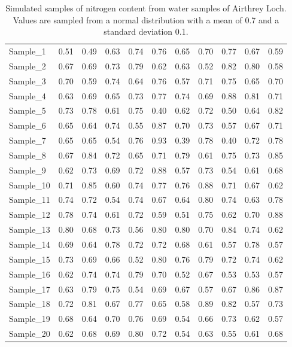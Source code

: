 \documentclass[
]{scrbook}
\begin{document}
\begin{longtable}[]{@{}lrrrrrrrrrr@{}}
\caption{\label{tab:unnamed-chunk-44}Simulated samples of nitrogen content from water samples of Airthrey Loch. Values are sampled from a normal distribution with a mean of 0.7 and a standard deviation 0.1.}\tabularnewline
\toprule
\endhead
Sample\_1 & 0.51 & 0.49 & 0.63 & 0.74 & 0.76 & 0.65 & 0.70 & 0.77 & 0.67 & 0.59 \\
Sample\_2 & 0.67 & 0.69 & 0.73 & 0.79 & 0.62 & 0.63 & 0.52 & 0.82 & 0.80 & 0.58 \\
Sample\_3 & 0.70 & 0.59 & 0.74 & 0.64 & 0.76 & 0.57 & 0.71 & 0.75 & 0.65 & 0.70 \\
Sample\_4 & 0.63 & 0.69 & 0.65 & 0.73 & 0.77 & 0.74 & 0.69 & 0.88 & 0.81 & 0.71 \\
Sample\_5 & 0.73 & 0.78 & 0.61 & 0.75 & 0.40 & 0.62 & 0.72 & 0.50 & 0.64 & 0.82 \\
Sample\_6 & 0.65 & 0.64 & 0.74 & 0.55 & 0.87 & 0.70 & 0.73 & 0.57 & 0.67 & 0.71 \\
Sample\_7 & 0.65 & 0.65 & 0.54 & 0.76 & 0.93 & 0.39 & 0.78 & 0.40 & 0.72 & 0.78 \\
Sample\_8 & 0.67 & 0.84 & 0.72 & 0.65 & 0.71 & 0.79 & 0.61 & 0.75 & 0.73 & 0.85 \\
Sample\_9 & 0.62 & 0.73 & 0.69 & 0.72 & 0.88 & 0.57 & 0.73 & 0.54 & 0.61 & 0.68 \\
Sample\_10 & 0.71 & 0.85 & 0.60 & 0.74 & 0.77 & 0.76 & 0.88 & 0.71 & 0.67 & 0.62 \\
Sample\_11 & 0.74 & 0.72 & 0.54 & 0.74 & 0.67 & 0.64 & 0.80 & 0.74 & 0.63 & 0.78 \\
Sample\_12 & 0.78 & 0.74 & 0.61 & 0.72 & 0.59 & 0.51 & 0.75 & 0.62 & 0.70 & 0.88 \\
Sample\_13 & 0.80 & 0.68 & 0.73 & 0.56 & 0.80 & 0.80 & 0.70 & 0.84 & 0.74 & 0.62 \\
Sample\_14 & 0.69 & 0.64 & 0.78 & 0.72 & 0.72 & 0.68 & 0.61 & 0.57 & 0.78 & 0.57 \\
Sample\_15 & 0.73 & 0.69 & 0.66 & 0.52 & 0.80 & 0.76 & 0.79 & 0.72 & 0.74 & 0.62 \\
Sample\_16 & 0.62 & 0.74 & 0.74 & 0.79 & 0.70 & 0.52 & 0.67 & 0.53 & 0.53 & 0.57 \\
Sample\_17 & 0.63 & 0.79 & 0.75 & 0.54 & 0.69 & 0.67 & 0.57 & 0.67 & 0.86 & 0.87 \\
Sample\_18 & 0.72 & 0.81 & 0.67 & 0.77 & 0.65 & 0.58 & 0.89 & 0.82 & 0.57 & 0.73 \\
Sample\_19 & 0.68 & 0.64 & 0.70 & 0.76 & 0.69 & 0.54 & 0.66 & 0.73 & 0.62 & 0.57 \\
Sample\_20 & 0.62 & 0.68 & 0.69 & 0.80 & 0.72 & 0.54 & 0.63 & 0.55 & 0.61 & 0.68 \\
\bottomrule
\end{longtable}
\end{document}
